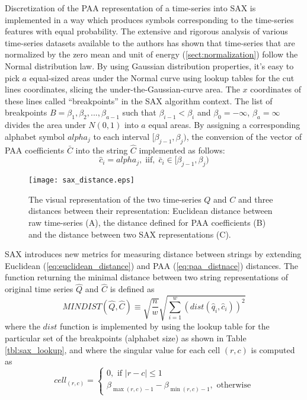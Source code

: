 Discretization of the PAA representation of a time-series into SAX is implemented in a way which produces symbols corresponding to the time-series features with equal probability. The extensive and rigorous analysis of various time-series datasets available to the authors has shown that time-series that are normalized by the zero mean and unit of energy (\ref{sect:normalization}) follow the Normal distribution law. By using Gaussian distribution properties, it's easy to pick $a$ equal-sized areas under the Normal curve using  lookup tables  \cite{citeulike:4434481} for the cut lines coordinates, slicing the under-the-Gaussian-curve area. 
The $x$ coordinates of these lines called ``breakpoints'' in the SAX algorithm context. The list of breakpoints $B=\beta_{1}, \beta_{2}, ... , \beta_{a-1}$ such that $\beta_{i-1} < \beta_{i}$ and $\beta_{0} = -\infty$, $\beta_{a} = \infty$ divides the area under $N(0,1)$ into $a$ equal areas. By assigning a corresponding alphabet symbol $alpha_{j}$ to each interval $[\beta_{j-1},\beta_{j})$, the conversion of the vector of PAA coefficients $\bar{C}$ into the string $\hat{C}$ implemented as follows:
\begin{equation}
\hat{c}_{i} = alpha_{j}, \; \text{iif}, \; \bar{c}_{i} \in [\beta_{j-1},\beta_{j})
\label{eq:alpha}
\end{equation}

\begin{figure}[tbp]
   \centering
   \texttt{[image: sax\_distance.eps]}
   \caption{The visual representation of the two time-series $Q$ and $C$ and three distances between their representation: Euclidean distance between raw time-series (A), the distance defined for PAA coefficients (B) and the distance between two SAX representations (C).}
   \label{fig:sax_distance}
\end{figure}

SAX introduces new metrics for measuring distance between strings by extending Euclidean (\ref{eq:euclidean_distance}) and PAA (\ref{eq:paa_distnace}) distances. The function returning the minimal distance between two string representations of original time series $\hat{Q}$ and $\hat{C}$ is defined as
\begin{equation}
MINDIST(\hat{Q},\hat{C}) \equiv \sqrt{ \frac{n}{w} } \sqrt{ \sum_{i=1}^{w} ( dist( \hat{q}_{i}, \hat{c}_{i} ) )^{2}}
\label{eq:sax_mindist}
\end{equation} 
where the $dist$ function is implemented by using the lookup table for the particular set of the breakpoints (alphabet size) as shown in Table \ref{tbl:sax_lookup}, and where the singular value for each cell $(r,c)$ is computed as 
\begin{equation}
cell_{(r,c)} = 
\begin{cases} 
0, \text{ if }\left| r-c \right| \leq 1 \\
\beta_{\max(r,c) - 1} - \beta_{\min(r,c) - 1}, \text{ otherwise}
\end{cases}
\label{eq:cell}
\end{equation}

